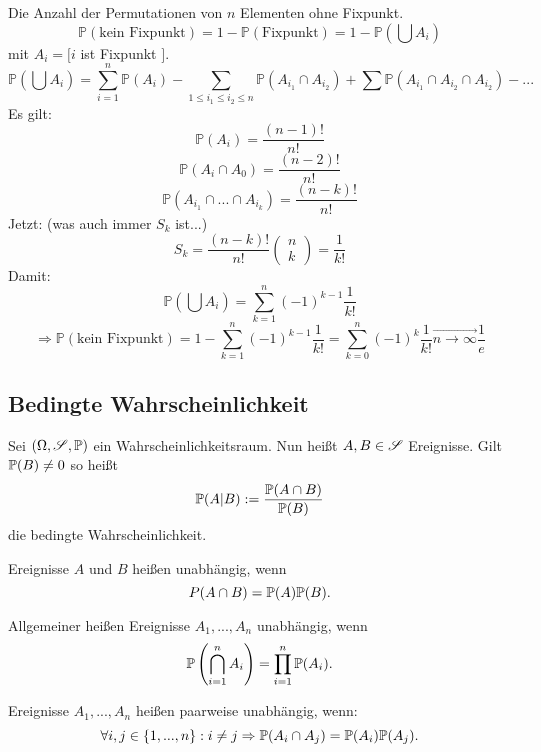 			\begin{bsp}[Additionstheorem]
				Die Anzahl der Permutationen von $n$ Elementen ohne Fixpunkt. 
				\[ \mathbb{P}(\text{kein Fixpunkt})=1-\mathbb{P}(\text{Fixpunkt})=1-\mathbb{P}\left(\bigcup A_i\right) \]
				mit $A_i=[i$ ist Fixpunkt $]$. 
				\[ \mathbb{P}\left(\bigcup A_i\right)=\sum_{i=1}^n\mathbb{P}(A_i)-\sum_{1\le i_1\le i_2\le n} \mathbb{P}(A_{i_1}\cap A_{i_2})+\sum \mathbb{P}(A_{i_1}\cap A_{i_2}\cap A_{i_2})-... \]
				Es gilt:
				\[ \mathbb{P}(A_i)=\frac{(n-1)!}{n!} \]
				\[ \mathbb{P}(A_i\cap A_0)=\frac{(n-2)!}{n!} \]
				\[ \mathbb{P}(A_{i_1}\cap ... \cap A_{i_k})=\frac{(n-k)!}{n!} \]
				Jetzt: (was auch immer $S_k$ ist...)
				\[ S_k=\frac{(n-k)!}{n!} \left(\begin{array}{c} n \\ k \end{array}\right)=\frac{1}{k!} \]
				Damit:
				\[ \mathbb{P}\left(\bigcup A_i\right)=\sum_{k=1}^n (-1)^{k-1} \frac{1}{k!} \]
				\[ \Rightarrow \mathbb{P}(\text{kein Fixpunkt})=1-\sum_{k=1}^n(-1)^{k-1} \frac{1}{k!}=\sum_{k=0}^n (-1)^k \frac{1}{k!}\stackrel{\rightarrow}{n\to\infty} \frac{1}{e} \]
			\end{bsp}
			
			\subsection{Bedingte Wahrscheinlichkeit}
			\begin{defi}
				Sei $(\Omega, \ms{S}, \P)$ ein Wahrscheinlichkeitsraum. Nun heißt $A,B\in\ms{S}$ Ereignisse. Gilt $\P(B)\neq 0$ so heißt 
				\[ \P(A|B):=\frac{\P(A\cap B)}{\P(B)} \]
				die bedingte Wahrscheinlichkeit. 
			\end{defi}
			
			\begin{defi}
				Ereignisse $A$ und $B$ heißen unabhängig, wenn
				\[ P(A\cap B)=\P(A)\P(B). \]
			\end{defi}
			
			\begin{defi}
				Allgemeiner heißen Ereignisse $A_1,...,A_n$ unabhängig, wenn
				\[ \P\left(\bigcap_{i=1}^n A_i\right) = \prod_{i=1}^n \P(A_i). \]
			\end{defi}
			
			\begin{defi}
				Ereignisse $A_1,...,A_n$ heißen paarweise unabhängig, wenn:
				\[ \forall i,j\in\{1,...,n\}: i\neq j\Rightarrow \P(A_i\cap A_j)=\P(A_i)\P(A_j). \]
			\end{defi}
			
